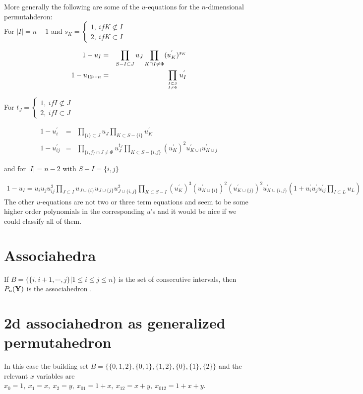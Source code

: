 \documentclass[hidelinks,12pt]{article}
\newcommand{\bea}[1]{\begin{eqnarray}\label{#1} }
\newcommand{\eea}{\end{eqnarray}}
\def\bea{\begin{eqnarray}}
\def\eea{\end{eqnarray}}
\begin{document}
\begin{enumerate}
More generally the following are some of the $u$-equations for the $n$-dimensional permutahderon:\\

For $|I| =n-1$ and $s_K = \begin{cases}  1,~ if K \not\subset I & \\ 2, ~if K \subset I\end{cases}$

\bea
1-u_{I} &=& \prod_ {S - I \subset J } u_{J} \prod_ {K \cap I \ne \Phi } (u^{'}_{K})^{s_K}  \nonumber \\
1-u_{12\cdots n} &=& \prod_ {{I \subset S}\atop {I \ne \Phi}} u^{'}_{I} \nonumber
\eea

For $t_J = \begin{cases}  1,~ if I  \not\subset J & \\ 2, ~if I \subset J \end{cases}$

\bea
1-u^{'}_{i} &=& \prod_ {\{ i \} \subset J } u_{J} \prod_ {K \subset S- \{i\} } u^{'}_{K} \nonumber \\
1-u^{'}_{i j} &=& \prod_ {\{i,j \}\cap J \ne \Phi} u^{t_J}_{J} \prod_ {K \subset S-\{i, j \} } (u^{'}_{K})^{2} u^{'}_{K \cup {i}} u^{'}_{K \cup{j} } \nonumber 
\eea

and for $|I| =n-2$ with $S- I = \{i, j\}$

\bea
1-u_{I}= u_i u_j u^{2}_{ij} \prod_{J \subset I} u_{J \cup \{i\}} u_{J \cup \{j\}} u^{2}_{J \cup \{i,j\}} \prod_{K \subset S-I} (u^{'}_K)^{3} (u^{'}_{K \cup \{i\}})^{2}  (u^{'}_{K \cup\{j\}})^{2}  u^{'}_{K\cup \{i,j\}} \left( 1+ u^{'}_i u^{'}_j u^{'}_{ij} \prod_{I \subset L} u_L \right)                       \nonumber
\eea
The other $u$-equations are not two or three term equations and seem to be some higher  order polynomials in the corresponding $u$'s and it would be nice if we could classify all of them.

\section*{Associahedra}
If $B=\{ \{i,i+1,\cdots,j \} | 1\leq  i \leq j \leq n\}$ is the set of consecutive intervals, then $P_n({\bf Y})$ is the associahedron .
\section*{2d associahedron as generalized permutahedron}
In this case the building set $B=\{ \{ 0,1,2\},\{ 0,1\},\{1,2\},\{0\},\{1\},\{2\}\}$ and the relevant $x$ variables are $x_0=1, ~x_1=x, ~x_2=y, ~x_{01}=1+x,~ x_{12}=x+y,~ x_{012}=1+x+y$. 


\end{enumerate}
\end{document}
